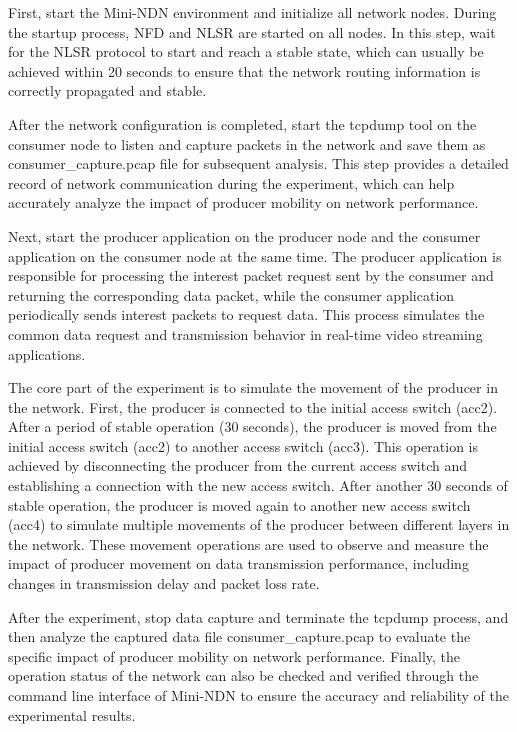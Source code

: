 \documentclass[conference]{IEEEtran}
\begin{document}
First, start the Mini-NDN environment and initialize all network nodes. During the startup process, NFD and NLSR are started on all nodes. In this step, wait for the NLSR protocol to start and reach a stable state, which can usually be achieved within 20 seconds to ensure that the network routing information is correctly propagated and stable.

After the network configuration is completed, start the tcpdump tool on the consumer node to listen and capture packets in the network and save them as consumer\_capture.pcap file for subsequent analysis. This step provides a detailed record of network communication during the experiment, which can help accurately analyze the impact of producer mobility on network performance.

Next, start the producer application on the producer node and the consumer application on the consumer node at the same time. The producer application is responsible for processing the interest packet request sent by the consumer and returning the corresponding data packet, while the consumer application periodically sends interest packets to request data. This process simulates the common data request and transmission behavior in real-time video streaming applications.

The core part of the experiment is to simulate the movement of the producer in the network. First, the producer is connected to the initial access switch (acc2). After a period of stable operation (30 seconds), the producer is moved from the initial access switch (acc2) to another access switch (acc3). This operation is achieved by disconnecting the producer from the current access switch and establishing a connection with the new access switch. After another 30 seconds of stable operation, the producer is moved again to another new access switch (acc4) to simulate multiple movements of the producer between different layers in the network. These movement operations are used to observe and measure the impact of producer movement on data transmission performance, including changes in transmission delay and packet loss rate.

After the experiment, stop data capture and terminate the tcpdump process, and then analyze the captured data file consumer\_capture.pcap to evaluate the specific impact of producer mobility on network performance. Finally, the operation status of the network can also be checked and verified through the command line interface of Mini-NDN to ensure the accuracy and reliability of the experimental results.
\end{document}
